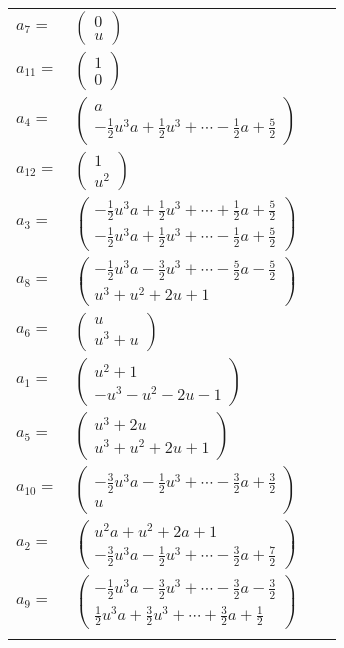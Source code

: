 \documentclass[1p]{elsarticle_modified}
\theoremstyle{definition}
\begin{document}
\begin{tabular}{m{7pt} m{180pt} m{7pt} m{180pt} }
\flushright $a_{7}=$&$\begin{pmatrix}0\\u\end{pmatrix}$ \\
\flushright $a_{11}=$&$\begin{pmatrix}1\\0\end{pmatrix}$ \\
\flushright $a_{4}=$&$\begin{pmatrix}a\\-\frac{1}{2} u^3 a+\frac{1}{2} u^3+\cdots-\frac{1}{2} a+\frac{5}{2}\end{pmatrix}$ \\
\flushright $a_{12}=$&$\begin{pmatrix}1\\u^2\end{pmatrix}$ \\
\flushright $a_{3}=$&$\begin{pmatrix}-\frac{1}{2} u^3 a+\frac{1}{2} u^3+\cdots+\frac{1}{2} a+\frac{5}{2}\\-\frac{1}{2} u^3 a+\frac{1}{2} u^3+\cdots-\frac{1}{2} a+\frac{5}{2}\end{pmatrix}$ \\
\flushright $a_{8}=$&$\begin{pmatrix}-\frac{1}{2} u^3 a-\frac{3}{2} u^3+\cdots-\frac{5}{2} a-\frac{5}{2}\\u^3+u^2+2 u+1\end{pmatrix}$ \\
\flushright $a_{6}=$&$\begin{pmatrix}u\\u^3+u\end{pmatrix}$ \\
\flushright $a_{1}=$&$\begin{pmatrix}u^2+1\\- u^3- u^2-2 u-1\end{pmatrix}$ \\
\flushright $a_{5}=$&$\begin{pmatrix}u^3+2 u\\u^3+u^2+2 u+1\end{pmatrix}$ \\
\flushright $a_{10}=$&$\begin{pmatrix}-\frac{3}{2} u^3 a-\frac{1}{2} u^3+\cdots-\frac{3}{2} a+\frac{3}{2}\\u\end{pmatrix}$ \\
\flushright $a_{2}=$&$\begin{pmatrix}u^2 a+u^2+2 a+1\\-\frac{3}{2} u^3 a-\frac{1}{2} u^3+\cdots-\frac{3}{2} a+\frac{7}{2}\end{pmatrix}$ \\
\flushright $a_{9}=$&$\begin{pmatrix}-\frac{1}{2} u^3 a-\frac{3}{2} u^3+\cdots-\frac{3}{2} a-\frac{3}{2}\\\frac{1}{2} u^3 a+\frac{3}{2} u^3+\cdots+\frac{3}{2} a+\frac{1}{2}\end{pmatrix}$\\&\end{tabular}
\end{document}
